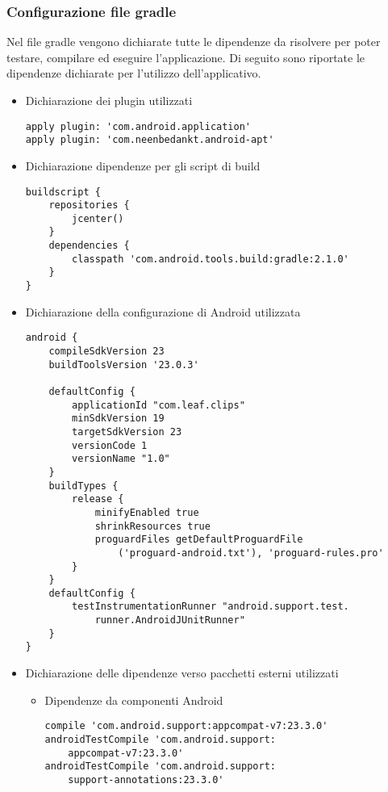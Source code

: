 \documentclass[../ManualeSviluppatore.tex]{subfiles}
\begin{document}
		\subsubsection{Configurazione file gradle}
		Nel file gradle vengono dichiarate tutte le dipendenze da risolvere per poter testare, compilare ed eseguire l'applicazione. Di seguito sono riportate le dipendenze dichiarate per l'utilizzo dell'applicativo. 
		\begin{itemize}
			\item Dichiarazione dei plugin utilizzati
			\lstset{language=Java}
			\begin{lstlisting}
apply plugin: 'com.android.application'
apply plugin: 'com.neenbedankt.android-apt'
			\end{lstlisting}
			\item Dichiarazione dipendenze per gli script di build
			\lstset{language=Java}
			\begin{lstlisting}
buildscript {
    repositories {
        jcenter()
    }
    dependencies {
        classpath 'com.android.tools.build:gradle:2.1.0'
    }
}
			\end{lstlisting}
			\item Dichiarazione della configurazione di Android utilizzata
			\lstset{language=Java}
			\begin{lstlisting}
android {
    compileSdkVersion 23
    buildToolsVersion '23.0.3'

    defaultConfig {
        applicationId "com.leaf.clips"
        minSdkVersion 19
        targetSdkVersion 23
        versionCode 1
        versionName "1.0"
    }
    buildTypes {
        release {
            minifyEnabled true
            shrinkResources true
            proguardFiles getDefaultProguardFile
            	('proguard-android.txt'), 'proguard-rules.pro'
        }
    }
    defaultConfig {
        testInstrumentationRunner "android.support.test.
        	runner.AndroidJUnitRunner"
    }
}

			\end{lstlisting}
			\item Dichiarazione delle dipendenze verso pacchetti esterni utilizzati
				\begin{itemize}
					\item Dipendenze da componenti Android		
						\lstset{language=Java}
						\begin{lstlisting}
compile 'com.android.support:appcompat-v7:23.3.0'
androidTestCompile 'com.android.support:
	appcompat-v7:23.3.0'
androidTestCompile 'com.android.support:
	support-annotations:23.3.0'


\end{lstlisting}
\end{itemize}
\end{itemize}
\end{document}
